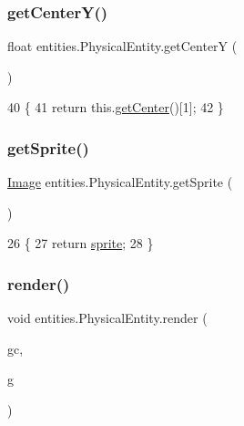 \subsubsection{\texorpdfstring{get\+Center\+Y()}{getCenterY()}}
{\footnotesize\ttfamily float entities.\+Physical\+Entity.\+get\+CenterY (\begin{DoxyParamCaption}{ }\end{DoxyParamCaption})\hspace{0.3cm}{\ttfamily [inline]}}


\begin{DoxyCode}
40                              \{
41         \textcolor{keywordflow}{return} this.\mbox{\hyperlink{classorg_1_1newdawn_1_1slick_1_1geom_1_1_shape_a1c413693dcdfc64cde4e604ccc930759}{getCenter}}()[1];
42     \}
\end{DoxyCode}
\mbox{\label{classentities_1_1_physical_entity_a000f49cb01d375f5e5fc254249b1d836}} 
\subsubsection{\texorpdfstring{get\+Sprite()}{getSprite()}}
{\footnotesize\ttfamily \mbox{\hyperlink{classorg_1_1newdawn_1_1slick_1_1_image}{Image}} entities.\+Physical\+Entity.\+get\+Sprite (\begin{DoxyParamCaption}{ }\end{DoxyParamCaption})\hspace{0.3cm}{\ttfamily [inline]}}


\begin{DoxyCode}
26                              \{
27         \textcolor{keywordflow}{return} \mbox{\hyperlink{classentities_1_1_physical_entity_aeb439b2308ab19fb6d3ff6be6f7cdbd8}{sprite}};
28     \}
\end{DoxyCode}
\mbox{\label{classentities_1_1_physical_entity_a69947328b7cf052e63fe2f8c367915df}} 
\subsubsection{\texorpdfstring{render()}{render()}}
{\footnotesize\ttfamily void entities.\+Physical\+Entity.\+render (\begin{DoxyParamCaption}\item[{\mbox{\hyperlink{classorg_1_1newdawn_1_1slick_1_1_game_container}{Game\+Container}}}]{gc,  }\item[{\mbox{\hyperlink{classorg_1_1newdawn_1_1slick_1_1_graphics}{Graphics}}}]{g }\end{DoxyParamCaption})\hspace{0.3cm}{\ttfamily [inline]}}


